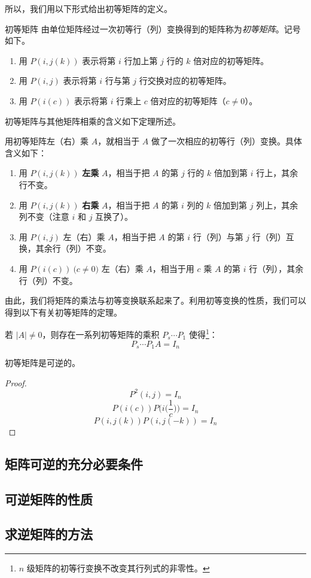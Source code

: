 所以，我们用以下形式给出初等矩阵的定义。

\begin{definition}{初等矩阵}
	由单位矩阵经过一次初等行（列）变换得到的矩阵称为\emph{初等矩阵}。记号如下。

	\begin{enumerate}
		\item 用 $P(i, j(k))$ 表示将第 $i$ 行加上第 $j$ 行的 $k$ 倍对应的初等矩阵。
		\item 用 $P(i, j)$ 表示将第 $i$ 行与第 $j$ 行交换对应的初等矩阵。
		\item 用 $P(i(c))$ 表示将第 $i$ 行乘上 $c$ 倍对应的初等矩阵（$c \ne 0$）。
	\end{enumerate}
\end{definition}

初等矩阵与其他矩阵相乘的含义如下定理所述。

\begin{theorem}
	用初等矩阵左（右）乘 $A$，就相当于 $A$ 做了一次相应的初等行（列）变换。具体含义如下：
	\begin{enumerate}
		\item 用 $P(i, j(k))$ \textbf{左乘} $A$，相当于把 $A$ 的第 $j$ 行的 $k$ 倍加到第 $i$ 行上，其余行不变。
		\item 用 $P(i, j(k))$ \textbf{右乘} $A$，相当于把 $A$ 的第 $i$ 列的 $k$ 倍加到第 $j$ 列上，其余列不变（注意 $i$ 和 $j$ 互换了）。
		\item 用 $P(i, j)$ 左（右）乘 $A$，相当于把 $A$ 的第 $i$ 行（列）与第 $j$ 行（列）互换，其余行（列）不变。
		\item 用 $P(i(c)) \pod{c \ne 0}$ 左（右）乘 $A$，相当于用 $c$ 乘 $A$ 的第 $i$ 行（列），其余行（列）不变。
	\end{enumerate}
\end{theorem}

由此，我们将矩阵的乘法与初等变换联系起来了。利用初等变换的性质，我们可以得到以下有关初等矩阵的定理。

\begin{theorem}
	若 $|A| \ne 0$，则存在一系列初等矩阵的乘积 $P_s \cdots P_1$ 使得\footnote{$n$ 级矩阵的初等行变换不改变其行列式的非零性。}：
	$$
	P_s \cdots P_1 A = I_n
	$$
\end{theorem}

\begin{theorem}
	初等矩阵是可逆的。
\end{theorem}

\begin{proof}
	$$
	P^2(i, j) = I_n
	$$$$
	P(i(c)) P \biggl( i \biggl( \frac{1}{c} \biggr) \biggr) = I_n
	$$$$
	P(i, j(k)) P(i, j(-k)) = I_n
	$$
\end{proof}

\subsection{矩阵可逆的充分必要条件}



\subsection{可逆矩阵的性质}



\subsection{求逆矩阵的方法}

